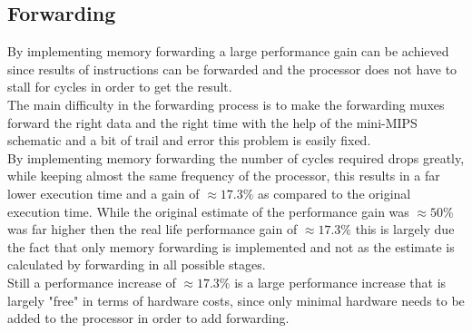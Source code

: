 \documentclass[10pt]{article}
\begin{document}
\subsection{Forwarding}
By implementing memory forwarding a large performance gain can be achieved since results of instructions can be forwarded and the processor does not have to stall for cycles in order to get the result.\\
The main difficulty in the forwarding process is to make the forwarding muxes forward the right data and the right time with the help of the mini-MIPS schematic and a bit of trail and error this problem is easily fixed. \\
By implementing memory forwarding the number of cycles required drops greatly, while keeping almost the same frequency of the processor, this results in a far lower execution time and a gain of $ \approx 17.3 \% $ as compared to the original execution time.
While the original estimate of the performance gain was $ \approx 50\% $ was far higher then the real life performance gain of $ \approx 17.3 \% $ this is largely due the fact that only memory forwarding is implemented and not as the estimate is calculated by forwarding in all possible stages.\\
Still a performance increase of $ \approx 17.3 \% $ is a large performance increase that is largely "free" in terms of hardware costs, since only minimal hardware needs to be added to the processor in order to add forwarding.
\end{document}
